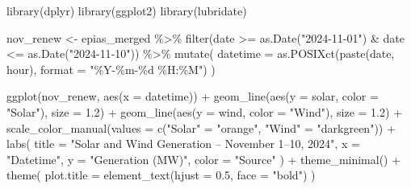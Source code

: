 \documentclass[
]{article}
\newenvironment{Shaded}{\begin{snugshade}}{\end{snugshade}}
\newcommand{\AttributeTok}[1]{\textcolor[rgb]{0.40,0.45,0.13}{#1}}
\newcommand{\FloatTok}[1]{\textcolor[rgb]{0.68,0.00,0.00}{#1}}
\newcommand{\FunctionTok}[1]{\textcolor[rgb]{0.28,0.35,0.67}{#1}}
\newcommand{\NormalTok}[1]{\textcolor[rgb]{0.00,0.23,0.31}{#1}}
\newcommand{\OtherTok}[1]{\textcolor[rgb]{0.00,0.23,0.31}{#1}}
\newcommand{\SpecialCharTok}[1]{\textcolor[rgb]{0.37,0.37,0.37}{#1}}
\newcommand{\StringTok}[1]{\textcolor[rgb]{0.13,0.47,0.30}{#1}}
\begin{document}
\begin{Shaded}
\begin{Highlighting}[]
\FunctionTok{library}\NormalTok{(dplyr)}
\FunctionTok{library}\NormalTok{(ggplot2)}
\FunctionTok{library}\NormalTok{(lubridate)}

\NormalTok{nov\_renew }\OtherTok{\textless{}{-}}\NormalTok{ epias\_merged }\SpecialCharTok{\%\textgreater{}\%}
  \FunctionTok{filter}\NormalTok{(date }\SpecialCharTok{\textgreater{}=} \FunctionTok{as.Date}\NormalTok{(}\StringTok{"2024{-}11{-}01"}\NormalTok{) }\SpecialCharTok{\&}\NormalTok{ date }\SpecialCharTok{\textless{}=} \FunctionTok{as.Date}\NormalTok{(}\StringTok{"2024{-}11{-}10"}\NormalTok{)) }\SpecialCharTok{\%\textgreater{}\%}
  \FunctionTok{mutate}\NormalTok{(}
    \AttributeTok{datetime =} \FunctionTok{as.POSIXct}\NormalTok{(}\FunctionTok{paste}\NormalTok{(date, hour), }\AttributeTok{format =} \StringTok{"\%Y{-}\%m{-}\%d \%H:\%M"}\NormalTok{)}
\NormalTok{  )}

\FunctionTok{ggplot}\NormalTok{(nov\_renew, }\FunctionTok{aes}\NormalTok{(}\AttributeTok{x =}\NormalTok{ datetime)) }\SpecialCharTok{+}
  \FunctionTok{geom\_line}\NormalTok{(}\FunctionTok{aes}\NormalTok{(}\AttributeTok{y =}\NormalTok{ solar, }\AttributeTok{color =} \StringTok{"Solar"}\NormalTok{), }\AttributeTok{size =} \FloatTok{1.2}\NormalTok{) }\SpecialCharTok{+}
  \FunctionTok{geom\_line}\NormalTok{(}\FunctionTok{aes}\NormalTok{(}\AttributeTok{y =}\NormalTok{ wind, }\AttributeTok{color =} \StringTok{"Wind"}\NormalTok{), }\AttributeTok{size =} \FloatTok{1.2}\NormalTok{) }\SpecialCharTok{+}
  \FunctionTok{scale\_color\_manual}\NormalTok{(}\AttributeTok{values =} \FunctionTok{c}\NormalTok{(}\StringTok{"Solar"} \OtherTok{=} \StringTok{"orange"}\NormalTok{, }\StringTok{"Wind"} \OtherTok{=} \StringTok{"darkgreen"}\NormalTok{)) }\SpecialCharTok{+}
  \FunctionTok{labs}\NormalTok{(}
    \AttributeTok{title =} \StringTok{"Solar and Wind Generation – November 1–10, 2024"}\NormalTok{,}
    \AttributeTok{x =} \StringTok{"Datetime"}\NormalTok{,}
    \AttributeTok{y =} \StringTok{"Generation (MW)"}\NormalTok{,}
    \AttributeTok{color =} \StringTok{"Source"}
\NormalTok{  ) }\SpecialCharTok{+}
  \FunctionTok{theme\_minimal}\NormalTok{() }\SpecialCharTok{+}
  \FunctionTok{theme}\NormalTok{(}
    \AttributeTok{plot.title =} \FunctionTok{element\_text}\NormalTok{(}\AttributeTok{hjust =} \FloatTok{0.5}\NormalTok{, }\AttributeTok{face =} \StringTok{"bold"}\NormalTok{)}
\NormalTok{  )}
\end{Highlighting}
\end{Shaded}
\end{document}
